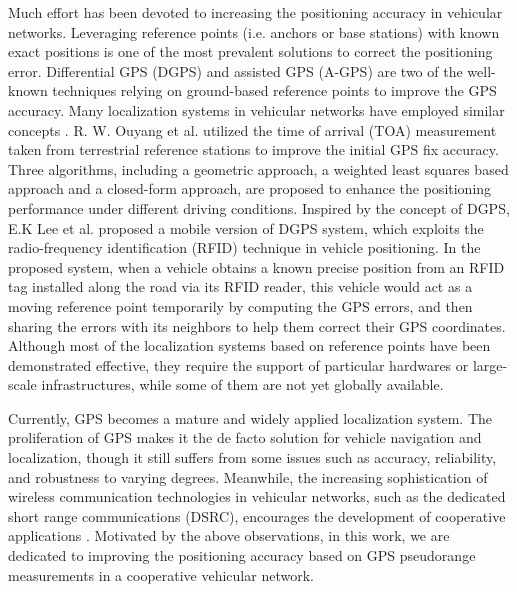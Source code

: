 \documentclass[letterpaper, 10 pt, conference]{ieeeconf}
\begin{document}
Much effort has been devoted to increasing the positioning accuracy in vehicular networks. Leveraging reference points (i.e. anchors or base stations) with known exact positions is one of the most prevalent solutions to correct the positioning error. Differential GPS (DGPS)  and assisted GPS (A-GPS)  are two of the well-known techniques relying on ground-based reference points to improve the GPS accuracy. Many localization systems in vehicular networks have employed similar concepts \cite{du2008next}. R. W. Ouyang et al. \cite{ouyang2010gps} utilized the time of arrival (TOA) measurement taken from terrestrial reference stations to improve the initial GPS fix accuracy. Three algorithms, including a geometric approach, a weighted least squares based approach and a closed-form approach, are proposed to enhance the positioning performance under different driving conditions. Inspired by the concept of DGPS, E.K Lee et al. \cite{lee2009rf} proposed a mobile version of DGPS system, which exploits the radio-frequency identification (RFID) technique in vehicle positioning. In the proposed system, when a vehicle obtains a known precise position from an RFID tag installed along the road via its RFID reader, this vehicle would act as a moving reference point temporarily by computing the GPS errors, and then sharing the errors with its neighbors to help them correct their GPS coordinates. Although most of the localization systems based on reference points have been demonstrated effective, they require the support of particular hardwares or large-scale infrastructures, while some of them are not yet globally available.

Currently, GPS becomes a mature and widely applied localization system. The proliferation of GPS makes it the de facto solution for vehicle navigation and localization, though it still suffers from some issues such as accuracy, reliability, and robustness to varying degrees. Meanwhile, the increasing sophistication of wireless communication technologies in vehicular networks, such as the dedicated short range communications (DSRC), encourages the development of cooperative applications \cite{liu2012adaptive}. Motivated by the above observations, in this work, we are dedicated to improving the positioning accuracy based on GPS pseudorange measurements in a cooperative vehicular network.
\end{document}
